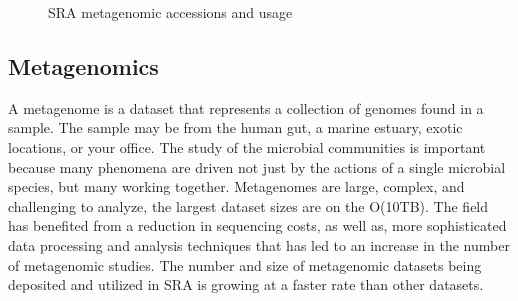 \begin{figure}%
    \centering
    \qquad
    \caption{SRA metagenomic accessions and usage}%
    \label{fig:metagenomicsradata}%
\end{figure}

\subsection{Metagenomics}
\label{sec:MetagenomicsData}

A metagenome is a dataset that represents a collection of genomes found in a sample. The sample may be from the human gut, a marine estuary, exotic locations, or your office. The study of the microbial communities is important because many phenomena are driven not just by the actions of a single microbial species, but many working together. Metagenomes are large, complex, and challenging to analyze, the largest dataset sizes are on the O(10TB). The field has benefited from a reduction in sequencing costs, as well as, more sophisticated data processing and analysis techniques that has led to an increase in the number of metagenomic studies. The number and size of metagenomic datasets being deposited and utilized in SRA is growing at a faster rate than other datasets.

